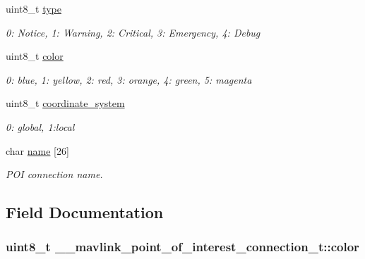 \begin{DoxyCompactItemize}
uint8\+\_\+t \hyperlink{struct____mavlink__point__of__interest__connection__t_a777b38b67a810499260974be41505265}{type}
\begin{DoxyCompactList}\small\item\em 0\+: Notice, 1\+: Warning, 2\+: Critical, 3\+: Emergency, 4\+: Debug \end{DoxyCompactList}\item 
uint8\+\_\+t \hyperlink{struct____mavlink__point__of__interest__connection__t_a81b2a541d9b1f33d655a1ee269759fad}{color}
\begin{DoxyCompactList}\small\item\em 0\+: blue, 1\+: yellow, 2\+: red, 3\+: orange, 4\+: green, 5\+: magenta \end{DoxyCompactList}\item 
uint8\+\_\+t \hyperlink{struct____mavlink__point__of__interest__connection__t_a1903c99ddce89a91721ed1b40762eb0b}{coordinate\+\_\+system}
\begin{DoxyCompactList}\small\item\em 0\+: global, 1\+:local \end{DoxyCompactList}\item 
char \hyperlink{struct____mavlink__point__of__interest__connection__t_a60444db83d1ccdb743e1069632427104}{name} \mbox{[}26\mbox{]}
\begin{DoxyCompactList}\small\item\em P\+O\+I connection name. \end{DoxyCompactList}\end{DoxyCompactItemize}


\subsection{Field Documentation}
\hypertarget{struct____mavlink__point__of__interest__connection__t_a81b2a541d9b1f33d655a1ee269759fad}{
\subsubsection[{color}]{\setlength{\rightskip}{0pt plus 5cm}uint8\+\_\+t \+\_\+\+\_\+mavlink\+\_\+point\+\_\+of\+\_\+interest\+\_\+connection\+\_\+t\+::color}}\label{struct____mavlink__point__of__interest__connection__t_a81b2a541d9b1f33d655a1ee269759fad}


